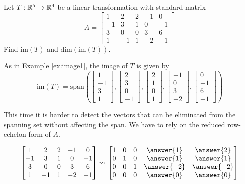 \documentclass{ximera}
\begin{document}
\begin{example}\label{ex:image2}
Let $T:\mathbb{R}^5\rightarrow \mathbb{R}^4$ be a linear transformation with standard matrix $$A=\begin{bmatrix}1 & 2 & 2 &-1 & 0\\-1 & 3 & 1 & 0 & -1\\3 & 0 & 0 & 3 & 6\\ 1 & -1 & 1 & -2 & -1\end{bmatrix}$$
Find $\mbox{im}(T)$ and $\mbox{dim}(\mbox{im}(T))$.
\begin{explanation}
As in Example \ref{ex:image1}, the image of $T$ is given by
$$\mbox{im}(T)=\mbox{span}\left(\begin{bmatrix}1\\-1\\3\\1\end{bmatrix}, \begin{bmatrix}2\\3\\0\\-1\end{bmatrix}, \begin{bmatrix}2\\1\\0\\1\end{bmatrix}, \begin{bmatrix}-1\\0\\3\\-2\end{bmatrix}, \begin{bmatrix}0\\-1\\6\\-1\end{bmatrix}\right)$$

This time it is harder to detect the vectors that can be eliminated from the spanning set without affecting the span.  We have to rely on the reduced row-echelon form of $A$.
 
$$\begin{bmatrix}1 & 2 & 2 &-1 & 0\\-1 & 3 & 1 & 0 & -1\\3 & 0 & 0 & 3 & 6\\ 1 & -1 & 1 & -2 & -1\end{bmatrix}  \rightsquigarrow \begin{bmatrix} 1 & 0 & 0 & \answer{1} & \answer{2}\\0 & 1 & 0 & \answer{1} & \answer{1}\\0 & 0 & 1 & \answer{-2} & \answer{-2}\\ 0 & 0 & 0 & \answer{0} & \answer{0} \end{bmatrix}$$
 

\end{explanation}
\end{example}
\end{document}
